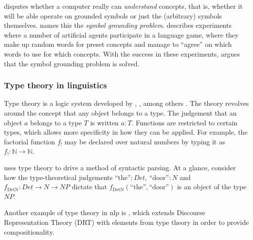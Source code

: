 \cite{SearleMindsbrainsprograms1980} disputes whether a computer really can \textit{understand} concepts, that is, whether it will be able operate on grounded symbols or just the (arbitrary) symbols themselves.
\cite{HarnadSymbolGroundingProblem1990} names this the \textit{symbol grounding problem}.
\cite{SteelsSymbolGroundingProblem2007} describes experiments where a number of artificial agents participate in a language game, where they make up random words for preset concepts and manage to ``agree'' on which words to use for which concepts.
With the success in these experiments, \citeauthor{SteelsSymbolGroundingProblem2007} argues that the symbol grounding problem is solved.



\subsubsection{Type theory in linguistics}

Type theory is a logic system developed by \cite{WhiteheadPrincipiamathematica1910}, \cite{church40}, \cite{martinlof84} among others \citep{CoquandTypeTheory2015}.
The theory revolves around the concept that any object belongs to a type.
The judgement that an object $a$ belongs to a type $T$ is written $a:T$.
Functions are restricted to certain types, which allows more specificity in how they can be applied.
For example, the factorial function $f_!$ may be declared over natural numbers by typing it as $f_! :\mathbb{N} \rightarrow \mathbb{N}$.

\cite{ranta-2011} uses type theory to drive a method of syntactic parsing.
At a glance, consider how the type-theoretical judgements $\text{``the''} : \mathit{Det}$, $\text{``door''} : \mathit{N}$ and $f_\text{DetN}:\mathit{Det}\rightarrow\mathit{N}\rightarrow\mathit{NP}$ dictate that $f_\text{DetN}(\text{``the''}, \text{``door''})$ is an object of the type $\mathit{NP}$.

Another example of type theory in \gls{nlp} is \cite{KohlhaseTypeTheoreticSemanticslDRT1996}, which extends Discourse Representation Theory (DRT) with elements from type theory in order to provide compositionality.




